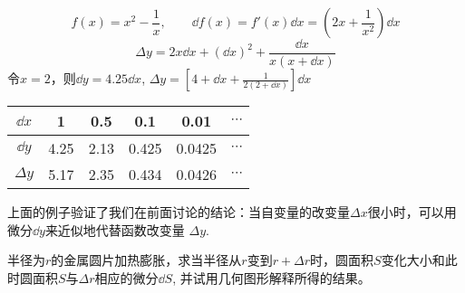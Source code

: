 \begin{example}
\[f(x)=x^2-\frac{1}{x},\qquad \dd f(x)=f'(x)\dd x=\left(2x+\frac{1}{x^2}\right)\dd x\]
\[\Delta y=2x\dd x+(\dd x)^2+\frac{\dd x}{x(x+\dd x)}\]
令$x=2$，则$\dd y=4.25\dd x$, $\Delta y=\left[4+\dd x+\frac{1}{2(2+\dd x)}\right]\dd x$
\begin{center}
    \begin{tabular}{cccccc}
        \hline
    $\dd x$ & 1& 0.5& 0.1 & 0.01& $\cdots$\\
        \hline
    $\dd y$& 4.25&2.13&0.425& 0.0425&$\cdots$\\
    \hline
    $\Delta y$& 5.17& 2.35&0.434&0.0426&$\cdots$\\
        \hline
    \end{tabular}
    \end{center}
上面的例子验证了我们在前面讨论的结论：当自变量的改变量$\Delta x$很小时，可以用微分$\dd y$来近似地代替函数改变量
$\Delta y$.
\end{example}

\begin{example}
    半径为$r$的金属圆片加热膨胀，求当半径从$r$变到$r+\Delta r$时，圆面积$S$变化大小和此时圆面积$S$与$\Delta r$相应的微分$\dd S$, 并试用几何图形解释所得的结果。
\end{example}

